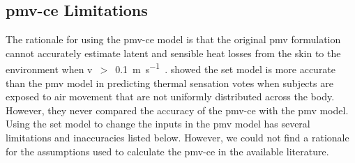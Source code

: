 \subsection{\ac{pmv-ce} Limitations}\label{subsec:pmv-ce-limitations}
The rationale for using the \ac{pmv-ce} model is that the original \ac{pmv} formulation cannot accurately estimate latent and sensible heat losses from the skin to the environment when \ac{v}~$>$~\qty{0.1}{\m\per\s}~\cite{huang_applicability_2014}.
 showed the \ac{set} model is more accurate than the \ac{pmv} model in predicting thermal sensation votes when subjects are exposed to air movement that are not uniformly distributed across the body.
However, they never compared the accuracy of the \ac{pmv-ce} with the \ac{pmv} model.
Using the \ac{set} model to change the inputs in the \ac{pmv} model has several limitations and inaccuracies listed below.
However, we could not find a rationale for the assumptions used to calculate the \ac{pmv-ce} in the available literature.
